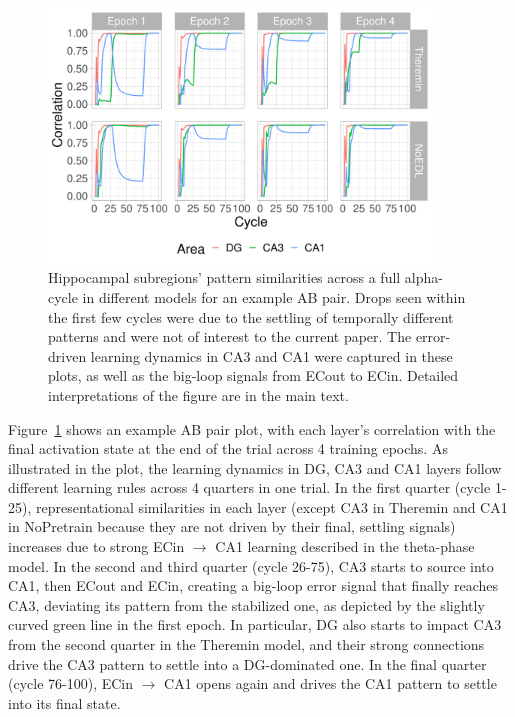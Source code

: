 \documentclass[11pt,twoside]{article}
\newif\myifpdf
\begin{document}
\begin{figure}
  \centering\includegraphics[width=4in]{fig_hip_edl_pat_sim}
  \caption{\footnotesize Hippocampal subregions' pattern similarities across a full alpha-cycle in different models for an example AB pair. Drops seen within the first few cycles were due to the settling of temporally different patterns and were not of interest to the current paper. The error-driven learning dynamics in CA3 and CA1 were captured in these plots, as well as the big-loop signals from ECout to ECin. Detailed interpretations of the figure are in the main text.}
\label{fig.pat_sim}
\end{figure}

Figure~\ref{fig.pat_sim} shows an example AB pair plot, with each layer's correlation with the final activation state at the end of the trial across 4 training epochs.  As illustrated in the plot, the learning dynamics in DG, CA3 and CA1 layers follow different learning rules across 4 quarters in one trial.  In the first quarter (cycle 1-25), representational similarities in each layer (except CA3 in Theremin and CA1 in NoPretrain because they are not driven by their final, settling signals) increases due to strong ECin $\rightarrow$ CA1 learning described in the theta-phase model.  In the second and third quarter (cycle 26-75), CA3 starts to source into CA1, then ECout and ECin, creating a big-loop error signal that finally reaches CA3, deviating its pattern from the stabilized one, as depicted by the slightly curved green line in the first epoch.  In particular, DG also starts to impact CA3 from the second quarter in the Theremin model, and their strong connections drive the CA3 pattern to settle into a DG-dominated one.  In the final quarter (cycle 76-100), ECin $\rightarrow$ CA1 opens again and drives the CA1 pattern to settle into its final state.  
\end{document}
